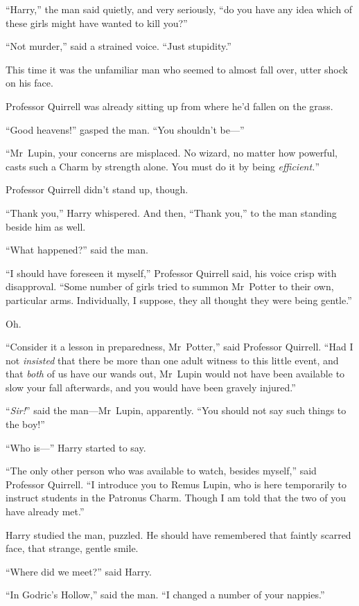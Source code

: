“Harry,” the man said quietly, and very seriously, “do you have any idea which of these girls might have wanted to kill you?”

“Not murder,” said a strained voice. “Just stupidity.”

This time it was the unfamiliar man who seemed to almost fall over, utter shock on his face.

Professor Quirrell was already sitting up from where he’d fallen on the grass.

“Good heavens!” gasped the man. “You shouldn’t be—”

“Mr~Lupin, your concerns are misplaced. No wizard, no matter how powerful, casts such a Charm by strength alone. You must do it by being \emph{efficient.}”

Professor Quirrell didn’t stand up, though.

“Thank you,” Harry whispered. And then, “Thank you,” to the man standing beside him as well.

“What happened?” said the man.

“I should have foreseen it myself,” Professor Quirrell said, his voice crisp with disapproval. “Some number of girls tried to summon Mr~Potter to their own, particular arms. Individually, I suppose, they all thought they were being gentle.”

Oh.

“Consider it a lesson in preparedness, Mr~Potter,” said Professor Quirrell. “Had I not \emph{insisted} that there be more than one adult witness to this little event, and that \emph{both} of us have our wands out, Mr~Lupin would not have been available to slow your fall afterwards, and you would have been gravely injured.”

“\emph{Sir!}” said the man—Mr~Lupin, apparently. “You should not say such things to the boy!”

“Who is—” Harry started to say.

“The only other person who was available to watch, besides myself,” said Professor Quirrell. “I introduce you to Remus Lupin, who is here temporarily to instruct students in the Patronus Charm. Though I am told that the two of you have already met.”

Harry studied the man, puzzled. He should have remembered that faintly scarred face, that strange, gentle smile.

“Where did we meet?” said Harry.

“In Godric’s Hollow,” said the man. “I changed a number of your nappies.”

